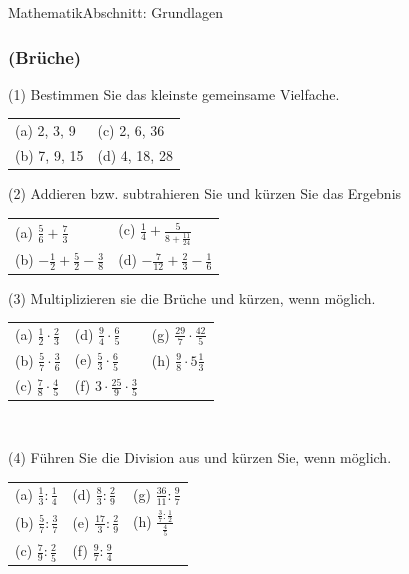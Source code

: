 \documentclass[11pt,twocolumn,oneside,openany,headings=optiontotoc,11pt,numbers=noenddot]{article}
\begin{document}
\begin{worksheet}{}{Mathematik}{Abschnitt: Grundlagen}
		\subsubsection*{(Brüche)}
		(1) Bestimmen Sie das kleinste gemeinsame Vielfache.\\
		\begin{tabularx}{0.5\textwidth}{XX}
			(a) 2, 3, 9 & (c) 2, 6, 36\\
			(b) 7, 9, 15 & (d) 4, 18, 28
		\end{tabularx}
		\par\bigskip\noindent
		(2) Addieren bzw. subtrahieren Sie und kürzen Sie das Ergebnis
		\begin{tabularx}{0.5\textwidth}{XX}
			(a) \(\frac{5}{6} + \frac{7}{3}\) & (c) \(\frac{1}{4} + \frac{5}{8 + \frac{11}{24}}\)\\
			(b) \(-\frac{1}{2}+\frac{5}{2}-\frac{3}{8}\) & (d) \(-\frac{7}{12} + \frac{2}{3} - \frac{1}{6}\)
		\end{tabularx}
		\par\bigskip\noindent
		(3) Multiplizieren sie die Brüche und kürzen, wenn möglich.
		\begin{tabularx}{0.5\textwidth}{XXX}
			(a) \(\frac{1}{2}\cdot\frac{2}{3}\) & (d) \(\frac{9}{4}\cdot\frac{6}{5}\) & (g) \(\frac{29}{7}\cdot\frac{42}{5}\)\\
			(b) \(\frac{5}{7}\cdot\frac{3}{6}\) & (e) \(\frac{5}{3}\cdot\frac{6}{5}\) & (h) \(\frac{9}{8}\cdot{}5\frac{1}{3}\)\\
			(c) \(\frac{7}{8}\cdot\frac{4}{5}\) & (f) \(3\cdot\frac{25}{9}\cdot\frac{3}{5}\)
		\end{tabularx}\\
		\par\bigskip\noindent
		(4) Führen Sie die Division aus und kürzen Sie, wenn möglich.
		\begin{tabularx}{0.5\textwidth}{XXX}
			(a) \(\frac{1}{3}:\frac{1}{4}\) & (d) \(\frac{8}{3}:\frac{2}{9}\) & (g) \(\frac{36}{11}:\frac{9}{7}\)\\
			(b) \(\frac{5}{7}:\frac{3}{7}\) & (e) \(\frac{17}{3}:\frac{2}{9}\) & (h) \(\frac{\frac{3}{7}:\frac{1}{2}}{\frac{4}{5}}\)\\
			(c) \(\frac{7}{9}:\frac{2}{5}\) & (f) \(\frac{9}{7}:\frac{9}{4}\)
		\end{tabularx}\\

\end{worksheet}
\end{document}
